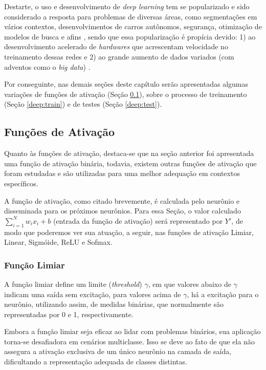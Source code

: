 Destarte, o uso e desenvolvimento de \textit{deep learning} tem se popularizado e sido considerado a resposta para problemas de diversas áreas, como segmentações em vários contextos, desenvolvimentos de carros autônomos, segurança, otimização de modelos de busca e afins \citep{Ghosh2019}, sendo que essa popularização é propícia devido: 1) ao desenvolvimento acelerado de \textit{hardwares} que acrescentam velocidade no treinamento dessas redes e 2) ao grande aumento de dados variados (com adventos como o \textit{big data}) \citep{Szegedy2015, ponti2018funciona}.

Por conseguinte, nas demais seções deste capítulo serão apresentadas algumas variações de funções de ativação (Seção \ref{deep:activation}), sobre o processo de treinamento (Seção \ref{deep:train}) e de testes (Seção \ref{deep:test}).


\subsection{Funções de Ativação}
\label{deep:activation}

Quanto às funções de ativação, destaca-se que na seção anterior foi apresentada uma função de ativação binária, todavia, existem outras funções de ativação que foram estudadas e são utilizadas para uma melhor adequação em contextos específicos.

A função de ativação, como citado brevemente, é calculada pelo neurônio e disseminada para os próximos neurônios.  Para essa Seção, o valor calculado $\sum_{i = 1}^{N} w_ix_i +b$ (entrada da função de ativação) será representado por $Y'$, de modo que poderemos ver sua atuação, a seguir, nas funções de ativação Limiar, Linear, Sigmóide, ReLU e Sofmax.


\subsubsection{Função Limiar}
\label{deep:limiar}
A função limiar define um limite (\textit{threshold}) $\gamma$, em que valores abaixo de $\gamma$ indicam uma saída sem excitação, para valores acima de $\gamma$, há a excitação para o neurônio, utilizando assim, de medidas binárias, que normalmente são representadas por 0 e 1, respectivamente.

Embora a função limiar seja eficaz ao lidar com problemas binários, sua aplicação torna-se desafiadora em cenários multiclasse. Isso se deve ao fato de que ela não assegura a ativação exclusiva de um único neurônio na camada de saída, dificultando a representação adequada de classes distintas.

